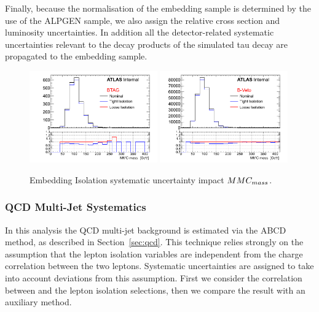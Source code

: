 Finally, because the normalisation of the embedding sample is determined by the use of the ALPGEN sample, 
we also assign the relative cross section and luminosity uncertainties. In addition
all the detector-related systematic uncertainties relevant to the decay products of the simulated tau 
decay are propagated to the embedding sample.
 
\begin{figure}[tp]
	\begin{center}
	\includegraphics[width=0.49\textwidth]{figure/systematics/emb_sys_BtagFull_Iso.png}
	\includegraphics[width=0.49\textwidth]{figure/systematics/emb_sys_NoBtagFull_Iso.png}
	\end{center}
	\caption{Embedding Isolation systematic uncertainty impact $MMC_{mass}$.}
	\label{fig:EMBISO}
\end{figure}

\subsubsection{QCD Multi-Jet Systematics}

In this analysis the QCD multi-jet background is estimated via the ABCD method, as
described in Section~\ref{sec:qcd}. This technique relies strongly on
the assumption that the lepton isolation variables are independent from the
charge correlation between the two leptons. Systematic uncertainties
are assigned to take into account deviations from this assumption.
First we consider the correlation between \rqcd and the lepton isolation selections,
then we compare the result with an auxiliary method. 


